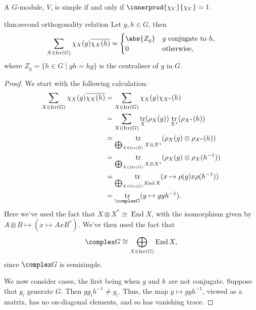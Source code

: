 \documentclass[fleqn]{NotesClass}
\DeclareMathOperator{\End}{End}
\newcommand{\isomorphic}{\cong}
\DeclareMathOperator{\Irr}{Irr}
\DeclareMathOperator{\tr}{tr}
\begin{document}
    \begin{crl}{}{}
        A \(G\)-module, \(V\), is simple if and only if \(\innerprod{\chi_V}{\chi_V} = 1\).
    \end{crl}
    
    \begin{thm}{}{thm:second orthogonality relation}
        Let \(g, h \in G\), then
        \begin{equation}
            \sum_{X \in \Irr(G)} \chi_X(g) \overline{\chi_X(h)} = 
            \begin{cases}
                \abs{Z_g} & g \text{ conjugate to }h,\\
                0 & \text{otherwise},
            \end{cases}
        \end{equation}
        where \(Z_g = \{h \in G \mid gh = hg\}\) is the centraliser of \(g\) in \(G\).
        \begin{proof}
            We start with the following calculation:
            \begin{align}
                \sum_{X \in \Irr(G)} \chi_X(g) \overline{\chi_X(h)} &= \sum_{X \in \Irr(G)} \chi_X(g) \chi_{X^*}(h)\\
                &= \sum_{X \in \Irr(G)} \tr_X(\rho_X(g)) \tr_{X^*}(\rho_{X^*}(h))\\
                &= \tr_{\bigoplus_{X \in \Irr(G)} X \otimes X^*} (\rho_X(g) \otimes \rho_{X^*}(h))\\
                &= \tr_{\bigoplus_{X \in \Irr(G)} X \otimes X^*} (\rho_X(g) \otimes \rho_X(h^{-1}))\\
                &= \tr_{\bigoplus_{X \in \Irr(G)} \End X} (x \mapsto \rho(g)x\rho(h^{-1}))\\
                &= \tr_{\complex G} (y \mapsto gyh^{-1}).
            \end{align}
            Here we've used the fact that \(X \otimes X^* \isomorphic \End X\), with the isomorphism given by \(A \otimes B \mapsto (x \mapsto AxB^*)\).
            We've then used the fact that
            \begin{equation}
                \complex G \isomorphic \bigoplus_{X \in \Irr(G)} \End X,
            \end{equation}
            since \(\complex G\) is semisimple.
            
            We now consider cases, the first being when \(g\) and \(h\) are not conjugate.
            Suppose that \(g_i\) generate \(G\).
            Then \(gg_ih^{-1} \ne g_i\).
            Thus, the map \(y \mapsto gyh^{-1}\), viewed as a matrix, has no on-diagonal elements, and so has vanishing trace.
            

\end{proof}
\end{thm}
\end{document}
